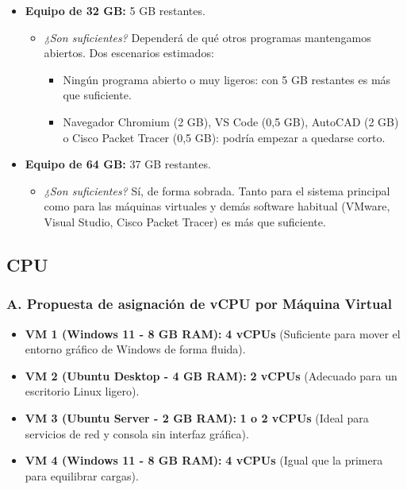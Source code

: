\documentclass[11.5pt]{article}
\begin{document}
	\begin{itemize}
		\item \textbf{Equipo de 32 GB:} 5 GB restantes.
		\begin{itemize}
			\item \textit{¿Son suficientes?} Dependerá de qué otros programas mantengamos abiertos. Dos escenarios estimados:
			\begin{itemize}
				\item Ningún programa abierto o muy ligeros: con 5 GB restantes es más que suficiente.
				\item Navegador Chromium (2 GB), VS Code (0,5 GB), AutoCAD (2 GB) o Cisco Packet Tracer (0,5 GB): podría empezar a quedarse corto.
			\end{itemize}
		\end{itemize}
		
		\item \textbf{Equipo de 64 GB:} 37 GB restantes.
		\begin{itemize}
			\item \textit{¿Son suficientes?} Sí, de forma sobrada. Tanto para el sistema principal como para las máquinas virtuales y demás software habitual (VMware, Visual Studio, Cisco Packet Tracer) es más que suficiente.
		\end{itemize}
	\end{itemize}
	
	\subsection{CPU}
	
	\subsubsection*{A. Propuesta de asignación de vCPU por Máquina Virtual}
	
	\begin{itemize}
		\item \textbf{VM 1 (Windows 11 - 8 GB RAM):} \textbf{4 vCPUs} (Suficiente para mover el entorno gráfico de Windows de forma fluida).
		\item \textbf{VM 2 (Ubuntu Desktop - 4 GB RAM):} \textbf{2 vCPUs} (Adecuado para un escritorio Linux ligero).
		\item \textbf{VM 3 (Ubuntu Server - 2 GB RAM):} \textbf{1 o 2 vCPUs} (Ideal para servicios de red y consola sin interfaz gráfica).
		\item \textbf{VM 4 (Windows 11 - 8 GB RAM):} \textbf{4 vCPUs} (Igual que la primera para equilibrar cargas).
	\end{itemize}
	
\end{document}
